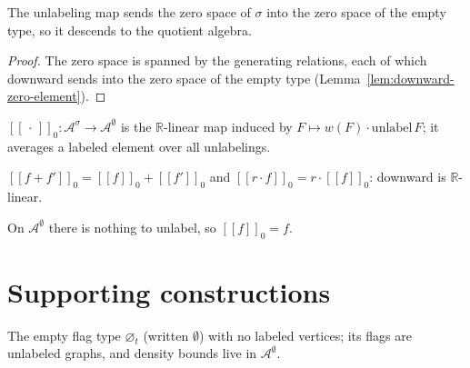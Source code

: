 \begin{lemma}
  \label{lem:downward-well-defined}
  \leanok
  The unlabeling map sends the zero space of $\sigma$ into the zero space of the
  empty type, so it descends to the quotient algebra.
\end{lemma}
\begin{proof}\leanok
  The zero space is spanned by the generating relations, each of which downward
  sends into the zero space of the empty type
  (Lemma~\ref{lem:downward-zero-element}).
\end{proof}

\begin{definition}
  \label{def:downward}
  \leanok
  $[\![\,\cdot\,]\!]_0 : \mathcal{A}^\sigma \to \mathcal{A}^\emptyset$ is the
  $\mathbb{R}$-linear map induced by $F \mapsto w(F)\cdot \mathrm{unlabel}\,F$;
  it averages a labeled element over all unlabelings.
\end{definition}

\begin{theorem}[Linearity]
  \label{thm:downward-linear}
  \leanok
  $[\![f+f']\!]_0 = [\![f]\!]_0 + [\![f']\!]_0$ and
  $[\![r\cdot f]\!]_0 = r\cdot[\![f]\!]_0$: downward is $\mathbb{R}$-linear.
\end{theorem}

\begin{theorem}
  \label{thm:downward-empty}
  \leanok
  On $\mathcal{A}^\emptyset$ there is nothing to unlabel, so
  $[\![f]\!]_0 = f$.
\end{theorem}

\section{Supporting constructions}

\begin{definition}
  \label{def:empty-type}
  \leanok
  The empty flag type $\varnothing_t$ (written $\emptyset$) with no labeled
  vertices; its flags are unlabeled graphs, and density bounds live in
  $\mathcal{A}^\emptyset$.
\end{definition}

